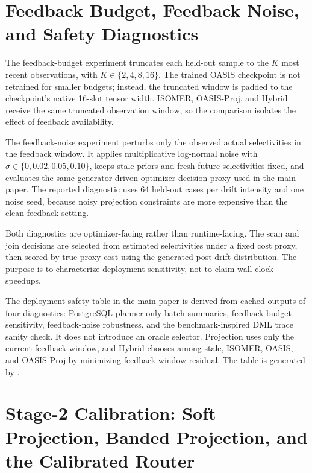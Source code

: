\documentclass[runningheads]{llncs}
\begin{document}
\section{Feedback Budget, Feedback Noise, and Safety Diagnostics}
\label{sec:feedback-sensitivity-app}

The feedback-budget experiment truncates each held-out sample to the $K$ most
recent observations, with $K\in\{2,4,8,16\}$. The trained OASIS checkpoint is
not retrained for smaller budgets; instead, the truncated window is padded to
the checkpoint's native 16-slot tensor width. ISOMER, OASIS-Proj, and Hybrid
receive the same truncated observation window, so the comparison isolates the
effect of feedback availability.

The feedback-noise experiment perturbs only the observed actual selectivities
in the feedback window. It applies multiplicative log-normal noise with
$\sigma\in\{0,0.02,0.05,0.10\}$, keeps stale priors and fresh future
selectivities fixed, and evaluates the same generator-driven
optimizer-decision proxy used in the main paper. The reported diagnostic uses
64 held-out cases per drift intensity and one noise seed, because noisy
projection constraints are more expensive than the clean-feedback setting.

Both diagnostics are optimizer-facing rather than runtime-facing. The scan and
join decisions are selected from estimated selectivities under a fixed cost
proxy, then scored by true proxy cost using the generated post-drift
distribution. The purpose is to characterize deployment sensitivity, not to
claim wall-clock speedups.

The deployment-safety table in the main paper is derived from cached outputs of
four diagnostics: PostgreSQL planner-only batch summaries, feedback-budget
sensitivity, feedback-noise robustness, and the benchmark-inspired DML trace
sanity check. It does not introduce an oracle selector. Projection uses only the
current feedback window, and Hybrid chooses among stale, ISOMER, OASIS, and
OASIS-Proj by minimizing feedback-window residual. The table is generated by
.

\section{Stage-2 Calibration: Soft Projection, Banded Projection, and the Calibrated Router}
\label{sec:stage2-calibration-app}
\end{document}
